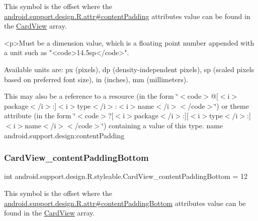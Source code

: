 This symbol is the offset where the \hyperlink{classandroid_1_1support_1_1design_1_1R_1_1attr_ade364e02c1282d837b631e217bb67d9d}{android.\+support.\+design.\+R.\+attr\#content\+Padding} attribute\textquotesingle{}s value can be found in the \hyperlink{classandroid_1_1support_1_1design_1_1R_1_1styleable_a56025691fb136d28dc5fce5a25d7c65e}{Card\+View} array.

\begin{DoxyVerb}      <p>Must be a dimension value, which is a floating point number appended with a unit such as "<code>14.5sp</code>".
\end{DoxyVerb}
 Available units are\+: px (pixels), dp (density-\/independent pixels), sp (scaled pixels based on preferred font size), in (inches), mm (millimeters). 

This may also be a reference to a resource (in the form \char`\"{}$<$code$>$@\mbox{[}$<$i$>$package$<$/i$>$\+:\mbox{]}$<$i$>$type$<$/i$>$\+:$<$i$>$name$<$/i$>$$<$/code$>$\char`\"{}) or theme attribute (in the form \char`\"{}$<$code$>$?\mbox{[}$<$i$>$package$<$/i$>$\+:\mbox{]}\mbox{[}$<$i$>$type$<$/i$>$\+:\mbox{]}$<$i$>$name$<$/i$>$$<$/code$>$\char`\"{}) containing a value of this type.  name android.\+support.\+design\+:content\+Padding \mbox{\label{classandroid_1_1support_1_1design_1_1R_1_1styleable_aa50ab159eaffa56c7c1179a4bda584fd}} 
\subsubsection{\texorpdfstring{Card\+View\+\_\+content\+Padding\+Bottom}{CardView\_contentPaddingBottom}}
{\footnotesize\ttfamily int android.\+support.\+design.\+R.\+styleable.\+Card\+View\+\_\+content\+Padding\+Bottom = 12\hspace{0.3cm}{\ttfamily [static]}}

This symbol is the offset where the \hyperlink{classandroid_1_1support_1_1design_1_1R_1_1attr_a4b9aa67d8274a4e16423c353d91f3276}{android.\+support.\+design.\+R.\+attr\#content\+Padding\+Bottom} attribute\textquotesingle{}s value can be found in the \hyperlink{classandroid_1_1support_1_1design_1_1R_1_1styleable_a56025691fb136d28dc5fce5a25d7c65e}{Card\+View} array.

